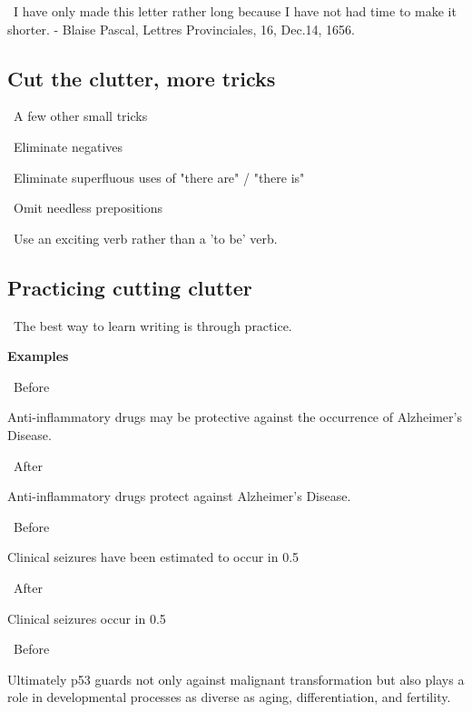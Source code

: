 \documentclass[a4paper,12pt]{article}
\begin{document}
\par\textbullet\ I have only made this letter rather long because I have not had time to make it shorter. - Blaise Pascal, Lettres Provinciales, 16, Dec.14, 1656.

\subsection{Cut the clutter, more tricks}

\par\textbullet\ A few other small tricks
\par\quad\textopenbullet\ Eliminate negatives
\par\quad\textopenbullet\ Eliminate superfluous uses of "there are" / "there is"
\par\quad\textopenbullet\ Omit needless prepositions

\par\textbullet\ Use an exciting verb rather than a 'to be' verb.

\newpage\subsection{Practicing cutting clutter}

\par\textbullet\ The best way to learn writing is through practice.

\par\textbf{Examples}

\par\textbullet\ Before
\par Anti-inflammatory drugs may be protective against the occurrence of Alzheimer’s Disease.

\par\textbullet\ After
\par Anti-inflammatory drugs protect against Alzheimer’s Disease.

\par\textbullet\ Before
\par Clinical seizures have been estimated to occur in 0.5%

\par\textbullet\ After
\par Clinical seizures occur in 0.5%

\par\textbullet\ Before
\par Ultimately p53 guards not only against malignant transformation but also plays a role in developmental processes as diverse as aging, differentiation, and fertility.
\end{document}
